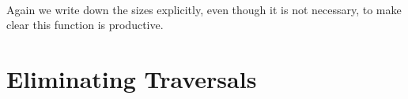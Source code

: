 \begin{code}%
\>[0]\AgdaSpace{}%
\AgdaSymbol{:}\AgdaSpace{}%
\AgdaSymbol{\{}\AgdaSpace{}%
\AgdaSymbol{:}\AgdaSpace{}%
\AgdaSymbol{\}}\AgdaSpace{}%
\AgdaSpace{}%
\AgdaFunction{\&}\AgdaSymbol{(}\AgdaSpace{}%
\AgdaSpace{}%
\AgdaSpace{}%
\AgdaSymbol{)}\AgdaSpace{}%
\AgdaSpace{}%
\AgdaFunction{\&}\AgdaSpace{}%
\<%
\\
\>[0]\AgdaSpace{}%
\AgdaSymbol{:}\AgdaSpace{}%
\AgdaSymbol{\{}\AgdaSpace{}%
\AgdaSymbol{:}\AgdaSpace{}%
\AgdaSymbol{\}}\AgdaSpace{}%
\AgdaSpace{}%
\AgdaFunction{\&}\AgdaSymbol{(}\AgdaSpace{}%
\AgdaSpace{}%
\AgdaSpace{}%
\AgdaSymbol{)}\AgdaSpace{}%
\AgdaSpace{}%
\AgdaFunction{\&}\AgdaSpace{}%
\AgdaSymbol{(}\AgdaSpace{}%
\AgdaSymbol{)}\<%
\\
\>[0]\AgdaSpace{}%
\AgdaSpace{}%
\AgdaSymbol{\{}\AgdaSymbol{\}}\AgdaSpace{}%
\AgdaSymbol{=}\AgdaSpace{}%
\AgdaSpace{}%
\AgdaSymbol{\{}\AgdaSymbol{\}}\AgdaSpace{}%
\AgdaSymbol{(}\AgdaSpace{}%
\AgdaSpace{}%
\AgdaSymbol{\{}\AgdaSymbol{\})}\<%
\\
\>[0]\AgdaSpace{}%
\AgdaSymbol{(}\AgdaSpace{}%
\AgdaSpace{}%
\AgdaSymbol{\{}\AgdaSymbol{\})}\AgdaSpace{}%
\AgdaSymbol{\{}\AgdaSymbol{\}}\AgdaSpace{}%
\AgdaSymbol{=}\AgdaSpace{}%
\AgdaSpace{}%
\AgdaSpace{}%
\AgdaSymbol{\{}\AgdaSymbol{\}}\<%
\\
%
\\[\AgdaEmptyExtraSkip]%
\>[0]\AgdaSpace{}%
\AgdaSymbol{:}\AgdaSpace{}%
\AgdaFunction{\&}\AgdaSpace{}%
\<%
\\
\>[0]\AgdaSpace{}%
\AgdaSymbol{=}\AgdaSpace{}%
\AgdaSpace{}%
\<%
\end{code}

Again we write down the sizes explicitly, even though it is not necessary, to make clear this function is productive.

\section{Eliminating Traversals}
